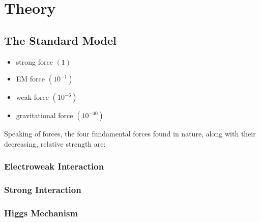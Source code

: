\chapter{Theory}
\label{ch:theory}

\section{The Standard Model}
\label{sec:sm}



\begin{itemize}
    \item strong force $(1)$
    \item EM force $(10^{-1})$
    \item weak force $(10^{-6})$
    \item gravitational force $(10^{-40})$
\end{itemize}
Speaking of forces, the four fundamental forces found in nature, along with their decreasing, relative strength are: 


\subsection{Electroweak Interaction}
\label{subsec:ew_inter}

\subsection{Strong Interaction}
\label{subsec:strong_inter}

\subsection{Higgs Mechanism}
\label{subsec:higgs_mech}
